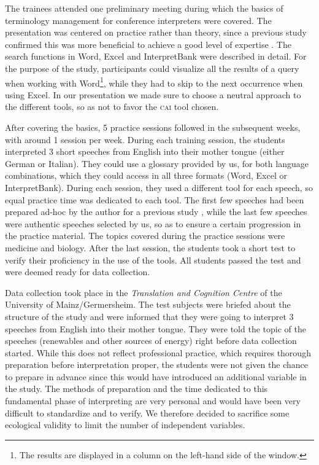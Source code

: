 \documentclass[output=paper]{langsci/langscibook}
\begin{document}
The trainees attended one preliminary meeting during which the basics of terminology management for conference interpreters were covered. The presentation was centered on practice rather than theory, since a previous study confirm\-ed this was more beneficial to achieve a good level of expertise \citep{Prandi2015a, Prandi2015b}. The search functions in Word, Excel and InterpretBank were described in detail. For the purpose of the study, participants could visualize all the results of a query when working with Word\footnote{The results are displayed in a column on the left-hand side of the window.}, while they had to skip to the next occurrence when using Excel. In our presentation we made sure to choose a neutral approach to the different tools, so as not to favor the \textsc{cai} tool chosen.

After covering the basics, 5 practice sessions followed in the subsequent weeks, with around 1 session per week. During each training session, the students interpreted 3 short speeches from English into their mother tongue (either German or Italian). They could use a glossary provided by us, for both language combinations, which they could access in all three formats (Word, Excel or InterpretBank). During each session, they used a different tool for each speech, so equal practice time was dedicated to each tool. The first few speeches had been prepared ad-hoc by the author for a previous study \citep{Prandi2015a, Prandi2015b}, while the last few speeches were authentic speeches selected by us, so as to ensure a certain progression in the practice material. The topics covered during the practice sessions were medicine and biology. After the last session, the students took a short test to verify their proficiency in the use of the tools. All students passed the test and were deemed ready for data collection.

Data collection took place in the \textit{Translation and Cognition Centre} of the University of Mainz\slash Germersheim. The test subjects were briefed about the structure of the study and were informed that they were going to interpret 3 speeches from English into their mother tongue. They were told the topic of the speeches (renewables and other sources of energy) right before data collection started. While this does not reflect professional practice, which requires thorough preparation before interpretation proper, the students were not given the chance to prepare in advance since this would have introduced an additional variable in the study. The methods of preparation and the time dedicated to this fundamental phase of interpreting are very personal and would have been very difficult to standardize and to verify. We therefore decided to sacrifice some ecological validity to limit the number of independent variables.
\end{document}
